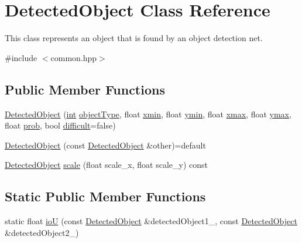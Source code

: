 \hypertarget{classDetectedObject}{}\section{Detected\+Object Class Reference}
\label{classDetectedObject}


This class represents an object that is found by an object detection net.  




{\ttfamily \#include $<$common.\+hpp$>$}

\subsection*{Public Member Functions}
\begin{DoxyCompactItemize}
\item 
\hyperlink{classDetectedObject_af8bb6bc4a124e4602c4b6d4617a0079e}{Detected\+Object} (\hyperlink{CMakeCache_8txt_a79a3d8790b2588b09777910863574e09}{int} \hyperlink{classDetectedObject_aff19c53a4ee1d27656acf6b6fbd9cfa0}{object\+Type}, float \hyperlink{classDetectedObject_af6a124efdbada32ae6cc6ed8207957ba}{xmin}, float \hyperlink{classDetectedObject_a18ef6bb15e7c47d41d9c2c9d4b8b133c}{ymin}, float \hyperlink{classDetectedObject_a8e120d3f08cb0f6c41b10a082bd0df04}{xmax}, float \hyperlink{classDetectedObject_ab130fc061e711904966077c8b8e294e7}{ymax}, float \hyperlink{classDetectedObject_a1d49d73edce36d93ee88b202bdcb961d}{prob}, bool \hyperlink{classDetectedObject_a11e8106cf6abc1bab40e292001930fa2}{difficult}=false)
\item 
\hyperlink{classDetectedObject_a004b71df72381832a5f7c5bfc8d9ca95}{Detected\+Object} (const \hyperlink{classDetectedObject}{Detected\+Object} \&other)=default
\item 
\hyperlink{classDetectedObject}{Detected\+Object} \hyperlink{classDetectedObject_a715ed2f73f064657ca6e29e94f30dae1}{scale} (float scale\+\_\+x, float scale\+\_\+y) const 
\end{DoxyCompactItemize}
\subsection*{Static Public Member Functions}
\begin{DoxyCompactItemize}
\item 
static float \hyperlink{classDetectedObject_abc68e001862990d52703deff97fe0db6}{ioU} (const \hyperlink{classDetectedObject}{Detected\+Object} \&detected\+Object1\+\_\+, const \hyperlink{classDetectedObject}{Detected\+Object} \&detected\+Object2\+\_\+)
\end{DoxyCompactItemize}

